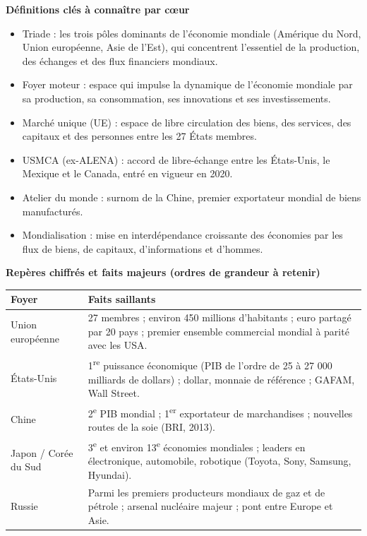 \documentclass[11pt]{article}
\newcommand{\cle}[1]{{\popxbold\color{popdark}#1}}
\begin{document}
\begin{bilan}
\textbf{Définitions clés à connaître par cœur}
\begin{itemize}
  \item \cle{Triade} : les trois pôles dominants de l'économie mondiale (Amérique du Nord, Union européenne, Asie de l'Est), qui concentrent l'essentiel de la production, des échanges et des flux financiers mondiaux.
  \item \cle{Foyer moteur} : espace qui impulse la dynamique de l'économie mondiale par sa production, sa consommation, ses innovations et ses investissements.
  \item \cle{Marché unique} (UE) : espace de libre circulation des biens, des services, des capitaux et des personnes entre les 27 États membres.
  \item \cle{USMCA} (ex-ALENA) : accord de libre-échange entre les États-Unis, le Mexique et le Canada, entré en vigueur en 2020.
  \item \cle{Atelier du monde} : surnom de la Chine, premier exportateur mondial de biens manufacturés.
  \item \cle{Mondialisation} : mise en interdépendance croissante des économies par les flux de biens, de capitaux, d'informations et d'hommes.
\end{itemize}

\textbf{Repères chiffrés et faits majeurs (ordres de grandeur à retenir)}
\begin{center}
\begin{tabularx}{\linewidth}{|l|X|}
\hline
\rowcolor{popblueL} \textbf{Foyer} & \textbf{Faits saillants} \\
\hline
Union européenne & 27 membres ; environ 450 millions d'habitants ; euro partagé par 20 pays ; premier ensemble commercial mondial à parité avec les USA. \\
\hline
États-Unis & 1\textsuperscript{re} puissance économique (PIB de l'ordre de 25 à 27 000 milliards de dollars) ; dollar, monnaie de référence ; GAFAM, Wall Street. \\
\hline
Chine & 2\textsuperscript{e} PIB mondial ; 1\textsuperscript{er} exportateur de marchandises ; nouvelles routes de la soie (BRI, 2013). \\
\hline
Japon / Corée du Sud & 3\textsuperscript{e} et environ 13\textsuperscript{e} économies mondiales ; leaders en électronique, automobile, robotique (Toyota, Sony, Samsung, Hyundai). \\
\hline
Russie & Parmi les premiers producteurs mondiaux de gaz et de pétrole ; arsenal nucléaire majeur ; pont entre Europe et Asie. \\
\hline
\end{tabularx}
\end{center}


\end{bilan}
\end{document}
